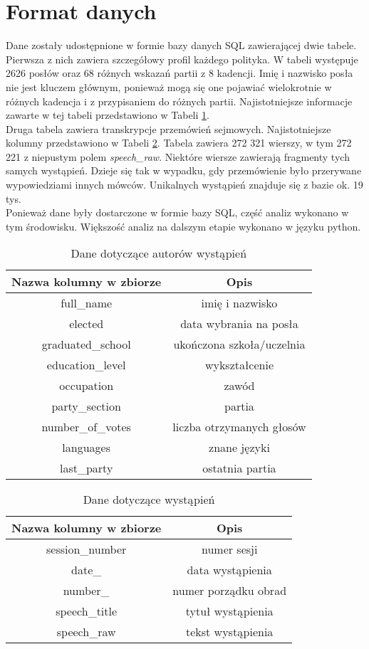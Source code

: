 \documentclass[a4paper,11pt,twoside]{report}
\theoremstyle{definition}
\begin{document}
\section{Format danych}
Dane zostały udostępnione w formie bazy danych SQL zawierającej dwie tabele. Pierwsza z nich zawiera szczegółowy profil każdego polityka. W tabeli występuje 2626 posłów oraz 68 różnych wskazań partii z 8 kadencji. Imię i nazwisko posła nie jest kluczem głównym, ponieważ mogą się one pojawiać wielokrotnie w różnych kadencja i z przypisaniem do różnych partii. Najistotniejsze informacje zawarte w tej tabeli przedstawiono w Tabeli \ref{t1}. \\

Druga tabela zawiera transkrypcje przemówień sejmowych. Najistotniejsze kolumny przedstawiono w Tabeli \ref{t2}. 
Tabela zawiera 272 321 wierszy, w tym 272 221 z niepustym polem \textit{speech\_raw}. Niektóre wiersze zawierają fragmenty tych samych wystąpień. Dzieje się tak w wypadku, gdy przemówienie było przerywane wypowiedziami innych mówców. Unikalnych wystąpień znajduje się z bazie ok. 19 tys. \\
Ponieważ dane były dostarczone w formie bazy SQL, część analiz wykonano w tym środowisku. Większość analiz na dalszym etapie wykonano w języku python.


\begin{table} \centering
\begin{tabular}{ |c|c| } 
 \hline
 Nazwa kolumny w zbiorze & Opis  \\ \hline
 full\_name & imię i nazwisko \\  \hline
 elected & data wybrania na posła \\ \hline
graduated\_school & ukończona szkoła/uczelnia \\ \hline
education\_level & wykształcenie \\ \hline
occupation & zawód \\ \hline
party\_section & partia \\ \hline
number\_of\_votes & liczba otrzymanych głosów \\ \hline
languages & znane języki \\ \hline
last\_party & ostatnia partia \\ \hline
\end{tabular}
\caption{Dane dotyczące autorów wystąpień}
\label{t1}
\end{table}

\begin{table}[h] \centering
\begin{tabular}{ |c|c| } 
 \hline
 Nazwa kolumny w zbiorze & Opis  \\ \hline
session\_number & numer sesji \\ \hline
date\_ & data wystąpienia \\ \hline
number\_ & numer porządku obrad  \\ \hline
speech\_title & tytuł wystąpienia \\ \hline
speech\_raw & tekst wystąpienia \\ \hline
\end{tabular}
\caption{Dane dotyczące wystąpień} \label{t2}
\end{table}
\end{document}
